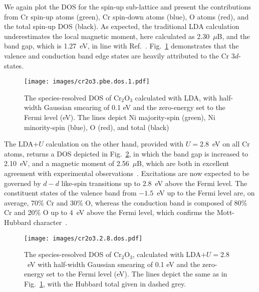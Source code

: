 {
We again plot the DOS for the spin-up sub-lattice 
and present the contributions from 
Cr spin-up atoms (green), 
Cr spin-down atoms (blue), 
O atoms (red), 
and the total spin-up DOS (black).}
%
As expected, 
the traditional LDA calculation underestimates 
the local magnetic moment, 
here calculated as 2.30~$\mu$B, 
and the band gap, which is 1.27~eV, 
in line with Ref.~\cite{PhysRevB.62.11997}.
%
Fig.~\ref{fig:cr2o3pbedos} demonstrates that 
the valence and conduction band edge states 
are heavily attributed to the Cr $3d$-states.

\begin{figure}[th!]
\centering
\texttt{[image: images/cr2o3.pbe.dos.1.pdf]}
\caption[Species-resolved DOS for Cr$_2$O$_3$ calculated with LDA]
{The species-resolved DOS of Cr$_2$O$_3$ 
calculated with LDA, 
with half-width Gaussian smearing of 0.1 eV 
and the zero-energy set to the Fermi level (eV).
%
The lines depict    
Ni majority-spin (green), 
Ni minority-spin (blue), 
O (red), 
and total (black)}
\label{fig:cr2o3pbedos}
\end{figure}


The LDA+$U$ calculation on the other hand, 
provided with $U=2.8$~eV on all Cr atoms, 
returns a DOS depicted in Fig.~\ref{fig:cr2o3.2.8.dos}, 
in which the band gap is increased to 2.10~eV, 
and a magnetic moment of 2.56~$\mu$B, 
which are both in excellent agreement 
with experimental observations~\cite{FISCHER19712455,HOWNG198075,PhysRevB.91.125202,doi:10.1021/jp404230k,doi:10.1063/1.1714118}.
%
Excitations are now expected to be governed by 
$d-d$ like-spin transitions up to 2.8~eV above the Fermi level.
%
The constituent states of the 
valence band from $-1.5$~eV 
up to the Fermi level are, 
on average, 
70\% Cr and 30\% O, 
whereas the conduction band is composed of 
80\% Cr and 20\% O 
up to 4~eV above the Fermi level, 
which confirms the Mott-Hubbard 
character~\cite{PhysRevB.79.104404}.

\begin{figure}[th!]
\centering
\texttt{[image: images/cr2o3.2.8.dos.pdf]}
\caption[Species-resolved DOS for Cr$_2$O$_3$ calculated with LDA+$U$]
{The species-resolved DOS of Cr$_2$O$_3$, 
calculated with LDA$+U=2.8$~eV
with half-width Gaussian smearing of 0.1 eV 
and the zero-energy set to the Fermi level (eV).
%
The lines depict the same as in Fig.~\ref{fig:cr2o3pbedos}, 
with the Hubbard total given in dashed grey.}
\label{fig:cr2o3.2.8.dos}
\end{figure}


